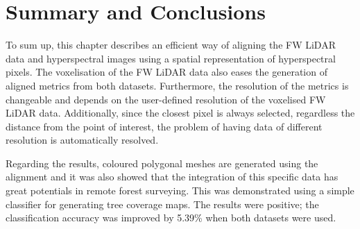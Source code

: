 \documentclass{subfiles}
\begin{document}
\newpage\newpage
\section {Summary and Conclusions}
\par To sum up, this chapter describes an efficient way of aligning the FW LiDAR data and hyperspectral images using a spatial representation of hyperspectral pixels. The voxelisation of the FW LiDAR data also eases the generation of aligned metrics from both datasets. Furthermore, the resolution of the metrics is changeable and depends on the user-defined resolution of the voxelised FW LiDAR data. Additionally, since the closest pixel is always selected, regardless the distance from the point of interest, the problem of having data of different resolution is automatically resolved. 

\par Regarding the results, coloured polygonal meshes are generated using the alignment and it was also showed that the integration of this specific data has great potentials in remote forest surveying. This was demonstrated using a simple classifier for generating tree coverage maps. The results were positive; the classification accuracy was improved by 5.39\% when both datasets were used.
\end{document}
